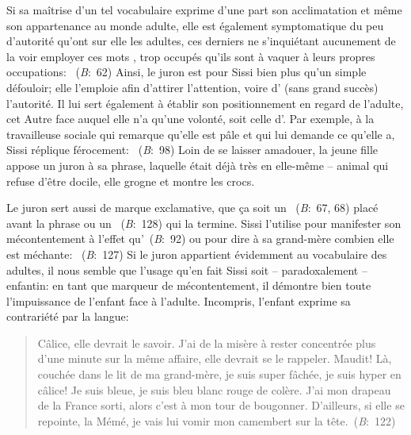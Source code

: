 \par
Si sa maîtrise d'un tel vocabulaire exprime d'une part son acclimatation et même son appartenance au monde adulte, elle est également symptomatique du peu d'autorité qu'ont sur elle les adultes, ces derniers ne s'inquiétant aucunement de la voir employer ces mots , trop occupés qu'ils sont à vaquer à leurs propres occupations: ~(\textit{B}:~62)
Ainsi, le juron est pour Sissi bien plus qu'un simple défouloir; elle l'emploie afin d'attirer l'attention, voire d' (sans grand succès) l'autorité.
Il lui sert également à établir son positionnement en regard de l'adulte, cet Autre face auquel elle n'a qu'une volonté, soit celle d'.
Par exemple, à la travailleuse sociale qui remarque qu'elle est pâle et qui lui demande ce qu'elle a, Sissi réplique férocement: ~(\textit{B}:~98)
Loin de se laisser amadouer, la jeune fille appose un juron à sa phrase, laquelle était déjà très  en elle-même -- animal qui refuse d'être docile, elle grogne et montre les crocs.
\par
Le juron sert aussi de marque exclamative, que ça soit un ~(\textit{B}:~67, 68) placé avant la phrase ou un ~(\textit{B}:~128) qui la termine.
Sissi l'utilise pour manifester son mécontentement à l'effet qu'~(\textit{B}:~92) ou pour dire à sa grand-mère combien elle est méchante: ~(\textit{B}:~127)
Si le juron appartient évidemment au vocabulaire des adultes, il nous semble que l'usage qu'en fait Sissi soit -- paradoxalement -- enfantin: en tant que marqueur de mécontentement, il démontre bien toute l'impuissance de l'enfant face à l'adulte.
Incompris, l'enfant exprime sa contrariété par la langue:
\begin{quote}
  \begin{singlespace}
    \small
    Câlice, elle devrait le savoir. J'ai de la misère à rester concentrée plus d'une minute sur la même affaire, elle devrait se le rappeler. Maudit! Là, couchée dans le lit de ma grand-mère, je suis super fâchée, je suis hyper en câlice! Je suis bleue, je suis bleu blanc rouge de colère. J'ai mon drapeau de la France sorti, alors c'est à mon tour de bougonner. D'ailleurs, si elle se repointe, la Mémé, je vais lui vomir mon camembert sur la tête.~(\textit{B}:~122)
    \normalsize
  \end{singlespace}
\end{quote}
